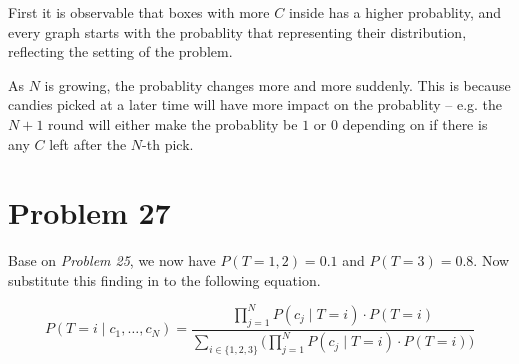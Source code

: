 \documentclass[12pt]{article}
\begin{document}
First it is observable that boxes with more $C$ inside has a higher probablity, and every graph starts with the probablity that representing their distribution, reflecting the setting of the problem.

As $N$ is growing, the probablity changes more and more suddenly. This is because candies picked at a later time will have more impact on the probablity -- e.g. the $N+1$ round will either make the probablity be $1$ or $0$ depending on if there is any $C$ left after the $N$-th pick.


\section{Problem 27}


Base on \textit{Problem 25}, we now have $P(T = 1, 2) = 0.1$ and  $P(T = 3) = 0.8$. Now substitute this finding in to the following equation.

\begin{equation*}
    P(T = i \mid c_1, \dots, c_N) = \frac{\prod\limits_{j = 1}^{N} P(c_j \mid T = i) \cdot P(T = i) }{\sum\limits_{i \in \{1, 2, 3\}} \big ( \prod\limits_{j = 1}^{N} P(c_j \mid T = i) \cdot P(T = i)\big ) }
\end{equation*}
\end{document}
